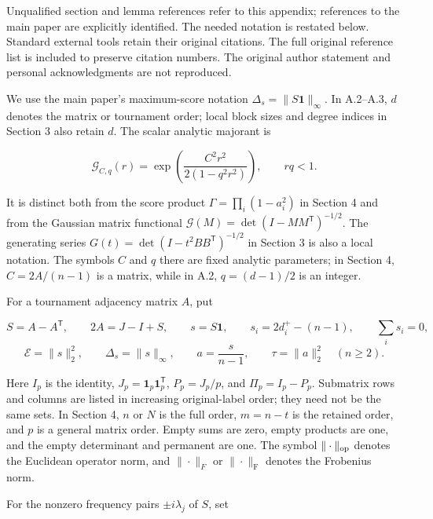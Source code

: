 \documentclass[11pt,a4paper]{article}
\makeatletter
\renewcommand\section{\@startsection{section}{1}{\z@}{-2.8ex plus -1ex minus -.2ex}{1.1ex plus .2ex}{\normalfont\large\bfseries}}
\makeatother
\begin{document}
Unqualified section and lemma references refer to this appendix; references to the main paper are explicitly identified. The needed notation is restated below. Standard external tools retain their original citations. The full original reference list is included to preserve citation numbers. The original author statement and personal acknowledgments are not reproduced.

\section{Notation}\label{notation}

We use the main paper's maximum-score notation \(\Delta_s=\|S\mathbf1\|_\infty\). In A.2--A.3, \(d\) denotes the matrix or tournament order; local block sizes and degree indices in Section 3 also retain \(d\). The scalar analytic majorant is

\[
\mathcal G_{C,q}(r)=\exp\!\left(\frac{C^2r^2}{2(1-q^2r^2)}\right),\qquad rq<1.
\]

It is distinct both from the score product \(\Gamma=\prod_i(1-a_i^2)\) in Section 4 and from the Gaussian matrix functional \(\mathcal G(M)=\det(I-MM^{\mathsf T})^{-1/2}\). The generating series \(G(t)=\det(I-t^2BB^{\mathsf T})^{-1/2}\) in Section 3 is also a local notation. The symbols \(C\) and \(q\) there are fixed analytic parameters; in Section 4, \(C=2A/(n-1)\) is a matrix, while in A.2, \(q=(d-1)/2\) is an integer.

For a tournament adjacency matrix \(A\), put

\[
S=A-A^{\mathsf T},\qquad 2A=J-I+S,\qquad s=S\mathbf1,
\qquad s_i=2d_i^+-(n-1),\qquad \sum_i s_i=0,
\] \[
\mathcal E=\|s\|_2^2,\qquad
\Delta_s=\|s\|_\infty,\qquad
a=\frac{s}{n-1},\qquad \tau=\|a\|_2^2\quad(n\ge2).
\]

Here \(I_p\) is the identity, \(J_p=\mathbf1_p\mathbf1_p^{\mathsf T}\), \(P_p=J_p/p\), and \(\Pi_p=I_p-P_p\). Submatrix rows and columns are listed in increasing original-label order; they need not be the same sets. In Section 4, \(n\) or \(N\) is the full order, \(m=n-t\) is the retained order, and \(p\) is a general matrix order. Empty sums are zero, empty products are one, and the empty determinant and permanent are one. The symbol \(\|\cdot\|_{\rm op}\) denotes the Euclidean operator norm, and \(\|\cdot\|_F\) or \(\|\cdot\|_{\mathrm F}\) denotes the Frobenius norm.

For the nonzero frequency pairs \(\pm i\lambda_j\) of \(S\), set
\end{document}
